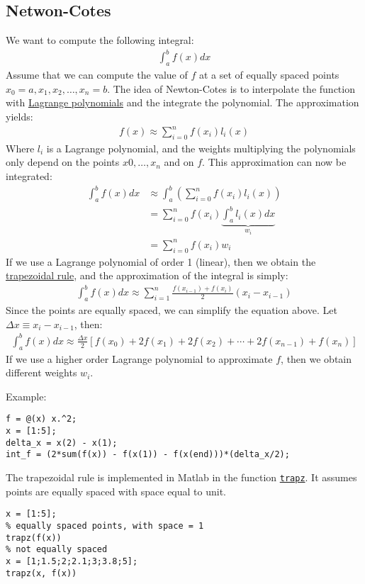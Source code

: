\documentclass[12pt, a4paper]{article}
\begin{document}
\subsection{Netwon-Cotes}
\label{sec:org43b98a0}
We want to compute the following integral:
\begin{align*}
\int_a^bf(x)dx
\end{align*}
Assume that we can compute the value of \(f\) at a set of equally spaced points \(x_0=a,x_1,x_2,\dots,x_n=b\).
The idea of Newton-Cotes is to interpolate the function with \href{https://en.wikipedia.org/wiki/Lagrange\_polynomial}{Lagrange polynomials} and the integrate the polynomial.
The approximation yields:
\begin{align*}
f(x)\approx \sum_{i=0}^nf(x_i)l_i(x)
\end{align*}
Where \(l_i\) is a Lagrange polynomial, and the weights multiplying the polynomials only depend on the points \(x0, \dots, x_n\) and on \(f\).
This approximation can now be integrated:
\begin{align*}
\int_a^b f(x)dx&\approx\int_a^b\left(\sum_{i=0}^nf(x_i)l_i(x)\right)\\
&=\sum_{i=0}^n f(x_i)\underbrace{\int_a^bl_i(x)dx}_{w_i}\\
&=\sum_{i=0}^nf(x_i)w_i
\end{align*}
If we use a Lagrange polynomial of order 1 (linear), then we obtain the \href{https://en.wikipedia.org/wiki/Trapezoidal\_rule}{trapezoidal rule}, and the approximation of the integral is simply:
\begin{align*}
\int_a^b f(x)dx\approx\sum_{i=1}^n\frac{f(x_{i-1}) + f(x_i)}{2}(x_i-x_{i-1})
\end{align*}
Since the points are equally spaced, we can simplify the equation above.
Let \(\Delta x\equiv x_i-x_{i-1}\), then:
\begin{align*}
\int_a^b f(x)dx\approx \frac{\Delta x}{2}\left[f(x_0) + 2f(x_1) + 2f(x_2) + \cdots + 2f(x_{n-1}) + f(x_n)\right]
\end{align*}
If we use a higher order Lagrange polynomial to approximate \(f\), then we obtain different weights \(w_i\).

Example:
\lstset{language=matlab,label= ,caption= ,captionpos=b,firstnumber=1,numbers=left,style=Matlab-editor}
\begin{lstlisting}
f = @(x) x.^2;
x = [1:5];
delta_x = x(2) - x(1);
int_f = (2*sum(f(x)) - f(x(1)) - f(x(end)))*(delta_x/2);
\end{lstlisting}
The trapezoidal rule is implemented in Matlab in the function \href{https://www.mathworks.com/help/matlab/ref/trapz.html}{\texttt{trapz}}.
It assumes points are equally spaced with space equal to unit.
\lstset{language=matlab,label= ,caption= ,captionpos=b,firstnumber=1,numbers=left,style=Matlab-editor}
\begin{lstlisting}
x = [1:5];
% equally spaced points, with space = 1
trapz(f(x))
% not equally spaced
x = [1;1.5;2;2.1;3;3.8;5];
trapz(x, f(x))
\end{lstlisting}
\end{document}
